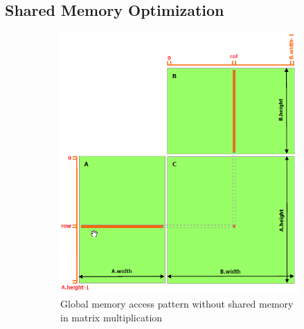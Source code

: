 \documentclass[modern,longauthor]{aastex7}
\begin{document}
\subsection{Shared Memory Optimization}\label{subsec:cuda-shared-memory}
\begin{figure}[htb!]
\centering
\begin{subfigure}{.47\textwidth}
  \centering
  \includegraphics[width=\linewidth]{CUDA/matmul-wo-shared-memory.png}
  \caption{Global memory access pattern without shared memory in matrix multiplication}
\end{subfigure}%
\begin{subfigure}{.05\textwidth}
  \hspace{1cm}
\end{subfigure}%
\begin{subfigure}{.47\textwidth}
  \centering

\end{subfigure}
\end{figure}
\end{document}
